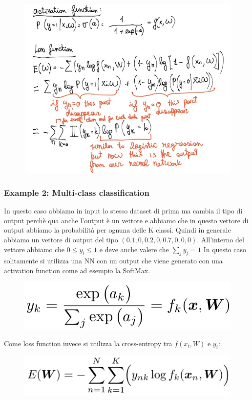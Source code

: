 \documentclass[14pt]{extreport}
\begin{document}
\begin{figure}[H]
\centering
\includegraphics[width=0.7\linewidth]{374.jpeg}
\end{figure}

\subsubsection{Example 2: Multi-class classification}

In questo caso abbiamo in input lo stesso dataset di prima ma cambia il tipo di output perchè qua anche l'output è un vettore e abbiamo che in questo
vettore di output abbiamo la probabilità per ognuna delle K classi. Quindi in generale abbiamo un vettore di output del tipo
$(0.1,0,0.2,0,0.7,0,0,0)$. All'interno del vettore abbiamo che $0 \leq y_i \leq 1$ e deve anche valere che $\sum_{j} y_j = 1$ In questo caso
solitamente si utilizza una NN con un output che viene generato con una activation function come ad esempio la SoftMax.
\begin{figure}[H]
\centering
\includegraphics[width=0.5\linewidth]{375.jpeg}
\end{figure}

Come loss function invece si utilizza la cross-entropy tra $f(x_i, W)$ e $y_i$:
\begin{figure}[H]
\centering
\includegraphics[width=0.5\linewidth]{376.jpeg}
\end{figure}
\end{document}
